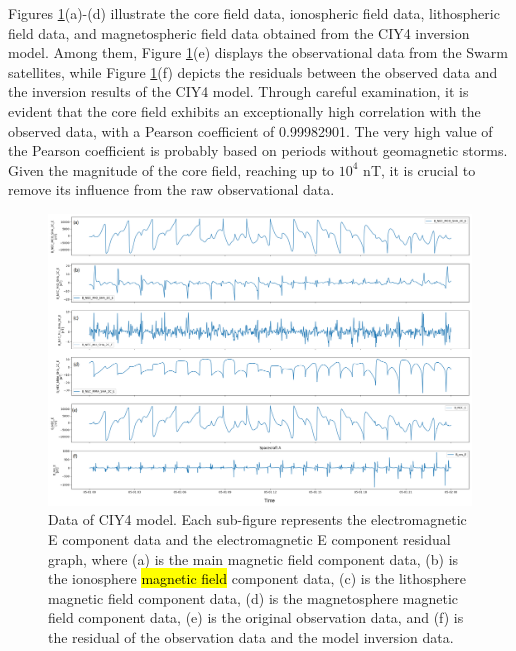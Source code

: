 \documentclass[3p,authoryear,preprint,12pt]{elsarticle}
\begin{document}
Figures \ref{fig:cyi4}(a)-(d) illustrate the core field data, ionospheric field data, lithospheric field data, and magnetospheric field data obtained from the CIY4 inversion model. Among them, Figure \ref{fig:cyi4}(e) displays the observational data from the Swarm satellites, while Figure \ref{fig:cyi4}(f) depicts the residuals between the observed data and the inversion results of the CIY4 model. Through careful examination, it is evident that the core field exhibits an exceptionally high correlation with the observed data, with a Pearson coefficient of 0.99982901. {The very high value of the Pearson coefficient is probably based on periods without geomagnetic storms.} Given the magnitude of the core field, reaching up to $10^4$ nT, it is crucial to remove its influence from the raw observational data.
\begin{figure}[htbp]
	\centering
	\includegraphics[width=1\linewidth]{CYI4Eng.png}
	\caption{Data of CIY4 model. {Each sub-figure represents the electromagnetic E component data and the electromagnetic E component residual graph, where (a) is the main magnetic field component data, (b) is the ionosphere \hl{magnetic field} component data, (c) is the lithosphere magnetic field component data, (d) is the magnetosphere magnetic field component data, (e) is the original observation data, and (f) is the residual of the observation data and the model inversion data.}}
	\label{fig:cyi4}
\end{figure}
%
\end{document}
